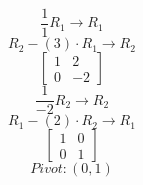 \documentclass{article}
\begin{document}
$$\frac1{1} R_{1} \rightarrow R_{1}$$
$$R_{2} - (3) \cdot R_{1} \rightarrow R_{2}$$
$$\left[\begin{matrix}1 & 2\\0 & -2\end{matrix}\right]$$
$$\frac1{-2} R_{2} \rightarrow R_{2}$$
$$R_{1} - (2) \cdot R_{2} \rightarrow R_{1}$$
$$\left[\begin{matrix}1 & 0\\0 & 1\end{matrix}\right]$$
$$Pivot:(0, 1)$$
\end{document}
